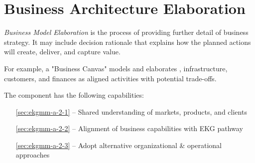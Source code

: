 \chapter{Business Architecture Elaboration}\label{ch:ekgmm-a-2} %

\textit{Business Model Elaboration} is the process of providing further detail of business strategy.
It may include decision rationale that explains how the planned actions will create, deliver, and capture value.

For example, a "Business Canvas" models and elaborates ,
infrastructure, customers, and finances as aligned activities with potential trade-offs.

The  component has the following capabilities:

\begin{itemize}[leftmargin=.5in]
  \item [\ref{sec:ekgmm-a-2-1}]  -- Shared understanding of markets, products, and clients
  \item [\ref{sec:ekgmm-a-2-2}]  -- Alignment of business capabilities with EKG pathway
  \item [\ref{sec:ekgmm-a-2-3}]  -- Adopt alternative organizational \& operational approaches
\end{itemize}






